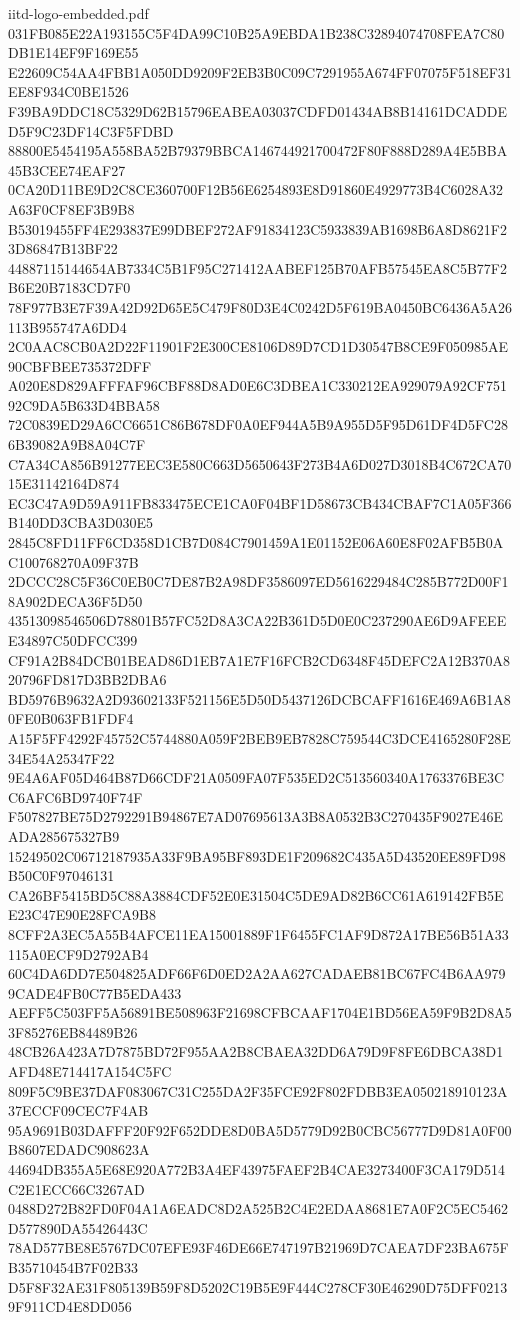 \begin{filecontents*}[overwrite]{iitd-logo-embedded.pdf}
031FB085E22A193155C5F4DA99C10B25A9EBDA1B238C32894074708FEA7C80DB1E14EF9F169E55
E22609C54AA4FBB1A050DD9209F2EB3B0C09C7291955A674FF07075F518EF31EE8F934C0BE1526
F39BA9DDC18C5329D62B15796EABEA03037CDFD01434AB8B14161DCADDED5F9C23DF14C3F5FDBD
88800E5454195A558BA52B79379BBCA146744921700472F80F888D289A4E5BBA45B3CEE74EAF27
0CA20D11BE9D2C8CE360700F12B56E6254893E8D91860E4929773B4C6028A32A63F0CF8EF3B9B8
B53019455FF4E293837E99DBEF272AF91834123C5933839AB1698B6A8D8621F23D86847B13BF22
44887115144654AB7334C5B1F95C271412AABEF125B70AFB57545EA8C5B77F2B6E20B7183CD7F0
78F977B3E7F39A42D92D65E5C479F80D3E4C0242D5F619BA0450BC6436A5A26113B955747A6DD4
2C0AAC8CB0A2D22F11901F2E300CE8106D89D7CD1D30547B8CE9F050985AE90CBFBEE735372DFF
A020E8D829AFFFAF96CBF88D8AD0E6C3DBEA1C330212EA929079A92CF75192C9DA5B633D4BBA58
72C0839ED29A6CC6651C86B678DF0A0EF944A5B9A955D5F95D61DF4D5FC286B39082A9B8A04C7F
C7A34CA856B91277EEC3E580C663D5650643F273B4A6D027D3018B4C672CA7015E31142164D874
EC3C47A9D59A911FB833475ECE1CA0F04BF1D58673CB434CBAF7C1A05F366B140DD3CBA3D030E5
2845C8FD11FF6CD358D1CB7D084C7901459A1E01152E06A60E8F02AFB5B0AC100768270A09F37B
2DCCC28C5F36C0EB0C7DE87B2A98DF3586097ED5616229484C285B772D00F18A902DECA36F5D50
43513098546506D78801B57FC52D8A3CA22B361D5D0E0C237290AE6D9AFEEEE34897C50DFCC399
CF91A2B84DCB01BEAD86D1EB7A1E7F16FCB2CD6348F45DEFC2A12B370A820796FD817D3BB2DBA6
BD5976B9632A2D93602133F521156E5D50D5437126DCBCAFF1616E469A6B1A80FE0B063FB1FDF4
A15F5FF4292F45752C5744880A059F2BEB9EB7828C759544C3DCE4165280F28E34E54A25347F22
9E4A6AF05D464B87D66CDF21A0509FA07F535ED2C513560340A1763376BE3CC6AFC6BD9740F74F
F507827BE75D2792291B94867E7AD07695613A3B8A0532B3C270435F9027E46EADA285675327B9
15249502C06712187935A33F9BA95BF893DE1F209682C435A5D43520EE89FD98B50C0F97046131
CA26BF5415BD5C88A3884CDF52E0E31504C5DE9AD82B6CC61A619142FB5EE23C47E90E28FCA9B8
8CFF2A3EC5A55B4AFCE11EA15001889F1F6455FC1AF9D872A17BE56B51A33115A0ECF9D2792AB4
60C4DA6DD7E504825ADF66F6D0ED2A2AA627CADAEB81BC67FC4B6AA9799CADE4FB0C77B5EDA433
AEFF5C503FF5A56891BE508963F21698CFBCAAF1704E1BD56EA59F9B2D8A53F85276EB84489B26
48CB26A423A7D7875BD72F955AA2B8CBAEA32DD6A79D9F8FE6DBCA38D1AFD48E714417A154C5FC
809F5C9BE37DAF083067C31C255DA2F35FCE92F802FDBB3EA050218910123A37ECCF09CEC7F4AB
95A9691B03DAFFF20F92F652DDE8D0BA5D5779D92B0CBC56777D9D81A0F00B8607EDADC908623A
44694DB355A5E68E920A772B3A4EF43975FAEF2B4CAE3273400F3CA179D514C2E1ECC66C3267AD
0488D272B82FD0F04A1A6EADC8D2A525B2C4E2EDAA8681E7A0F2C5EC5462D577890DA55426443C
78AD577BE8E5767DC07EFE93F46DE66E747197B21969D7CAEA7DF23BA675FB35710454B7F02B33
D5F8F32AE31F805139B59F8D5202C19B5E9F444C278CF30E46290D75DFF02139F911CD4E8DD056

\end{filecontents*}
